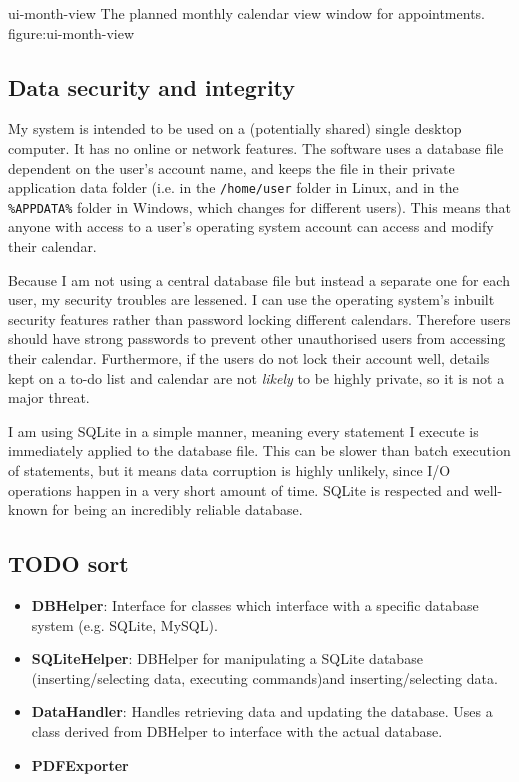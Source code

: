 \addfigure
    {ui-month-view}
    {The planned monthly calendar view window for appointments.}
    {figure:ui-month-view}


\subsection{Data security and integrity}

My system is intended to be used on a (potentially shared) single desktop
computer. It has no online or network features. The software uses a database
file dependent on the user's account name, and keeps the file in their private
application data folder (i.e. in the \texttt{/home/user} folder in Linux, and in
the \verb|%APPDATA%| folder in Windows, which changes for different users). This
means that anyone with access to a user's operating system account can access
and modify their calendar.

Because I am not using a central database file but instead a separate one for
each user, my security troubles are lessened. I can use the operating system's
inbuilt security features rather than password locking different calendars.
Therefore users should have strong passwords to prevent other unauthorised users
from accessing their calendar. Furthermore, if the users do not lock their
account well, details kept on a to-do list and calendar are not \textit{likely}
to be highly private, so it is not a major threat.

I am using SQLite in a simple manner, meaning every statement I execute is
immediately applied to the database file. This can be slower than batch
execution of statements, but it means data corruption is highly unlikely, since
I/O operations happen in a very short amount of time. SQLite is respected and
well-known for being an incredibly reliable database.







\subsection{TODO sort}

\newcommand{\classitem}[1]{\item \textbf{#1}}

\begin{itemize}
    \classitem{DBHelper}: Interface for classes which interface with a specific
    database system (e.g. SQLite, MySQL).
    \classitem{SQLiteHelper}: DBHelper for manipulating a SQLite database
    (inserting/selecting data, executing commands)and inserting/selecting data.
    \classitem{DataHandler}: Handles retrieving data and updating the database.
    Uses a class derived from DBHelper to interface with the actual database.
    \classitem{PDFExporter}
\end{itemize}

